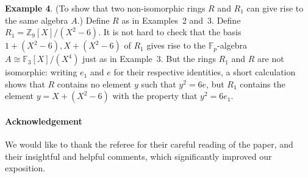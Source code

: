\documentclass[12pt]{article}
\begin{document}
\noindent
\textbf{Example 4}. (To show that two non-isomorphic rings $R$ and $R_1$ can give rise to the same algebra $A$.) Define $R$ as in Examples~2 and~3. Define $R_1=\mathbb{Z}_9[X]/(X^2-6)$. It is not hard to check that the basis $1+(X^2-6),X+(X^2-6)$ of $R_1$ gives rise to the $\mathbb{F}_p$-algebra $A\cong \mathbb{F}_{3}[X]/(X^{4})$ just as in Example~3. But the rings $R_1$ and $R$ are not isomorphic: writing $e_1$ and $e$ for their respective identities, a short calculation shows that $R$ contains no element $y$ such that $y^{2} = 6e$, but $R_1$ contains the element $y=X+(X^2-6)$ with the property that $y^2=6e_1$.

\paragraph{Acknowledgement} We would like to thank the referee for their careful reading of the paper, and their insightful and helpful comments, which significantly improved our exposition.
\end{document}
